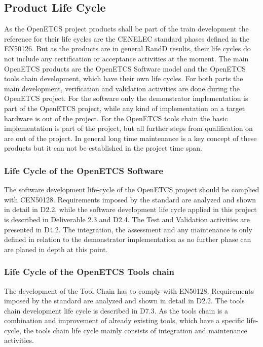 \documentclass{template/openetcs_article}
\begin{document}
\subsection{Product Life Cycle }

As the OpenETCS project products shall be part of the train development the reference for their life cycles are the CENELEC standard phases defined in the EN50126. But as the products are in general \gls{RandD} results, their life cycles do not include any certification or acceptance activities at the moment.
The main OpenETCS products are the OpenETCS Software model and the OpenETCS tools chain development, which have their own life cycles. For both parts the main development, verification and validation activities are done during the OpenETCS project. For the software only the demonstrator implementation is part of the OpenETCS project, while any kind of implementation on a target hardware is out of the project. 
For the OpenETCS tools chain the basic implementation is part of the project, but all further steps from qualification on are out of the project.
In general long time maintenance is a key concept of these products but it can not be established in the project time span. 

\subsubsection{Life Cycle of the OpenETCS Software}
The software development life-cycle of the OpenETCS project should be complied with CEN50128. Requirements imposed by the standard are analyzed and shown in detail in D2.2, while the software development life cycle applied in this project is described in Deliverable 2.3 and D2.4. The Test and Validation activities are presented in D4.2. The integration, the assessment and any maintenance is only defined in relation to the demonstrator implementation as no further phase can are planed in depth at this point.

\subsubsection{Life Cycle of the OpenETCS Tools chain}
The development of the Tool Chain has to comply with EN50128. Requirements imposed by the standard are analyzed and shown in detail in D2.2. The tools chain development life cycle is described in D7.3. As the tools chain is a combination and improvement of already existing tools, which have a specific life-cycle, the tools chain life cycle mainly consists of integration and maintenance activities. 
\end{document}
